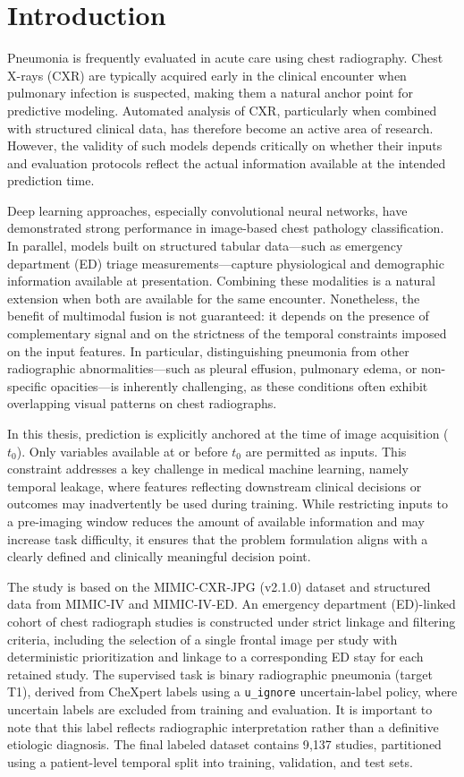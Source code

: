 \chapter{Introduction}

Pneumonia is frequently evaluated in acute care using chest radiography. Chest X-rays (CXR) are typically acquired early in the clinical encounter when pulmonary infection is suspected, making them a natural anchor point for predictive modeling. Automated analysis of CXR, particularly when combined with structured clinical data, has therefore become an active area of research. However, the validity of such models depends critically on whether their inputs and evaluation protocols reflect the actual information available at the intended prediction time.

Deep learning approaches, especially convolutional neural networks, have demonstrated strong performance in image-based chest pathology classification. In parallel, models built on structured tabular data—such as emergency department (ED) triage measurements—capture physiological and demographic information available at presentation. Combining these modalities is a natural extension when both are available for the same encounter. Nonetheless, the benefit of multimodal fusion is not guaranteed: it depends on the presence of complementary signal and on the strictness of the temporal constraints imposed on the input features. In particular, distinguishing pneumonia from other radiographic abnormalities—such as pleural effusion, pulmonary edema, or non-specific opacities—is inherently challenging, as these conditions often exhibit overlapping visual patterns on chest radiographs.

In this thesis, prediction is explicitly anchored at the time of image acquisition ($t_0$). Only variables available at or before $t_0$ are permitted as inputs. This constraint addresses a key challenge in medical machine learning, namely temporal leakage, where features reflecting downstream clinical decisions or outcomes may inadvertently be used during training. While restricting inputs to a pre-imaging window reduces the amount of available information and may increase task difficulty, it ensures that the problem formulation aligns with a clearly defined and clinically meaningful decision point.

The study is based on the MIMIC-CXR-JPG (v2.1.0) dataset and structured data from MIMIC-IV and MIMIC-IV-ED. An emergency department (ED)-linked cohort of chest radiograph studies is constructed under strict linkage and filtering criteria, including the selection of a single frontal image per study with deterministic prioritization and linkage to a corresponding ED stay for each retained study. The supervised task is binary radiographic pneumonia (target T1), derived from CheXpert labels using a \texttt{u\_ignore} uncertain-label policy, where uncertain labels are excluded from training and evaluation. It is important to note that this label reflects radiographic interpretation rather than a definitive etiologic diagnosis. The final labeled dataset contains 9{,}137 studies, partitioned using a patient-level temporal split into training, validation, and test sets.

